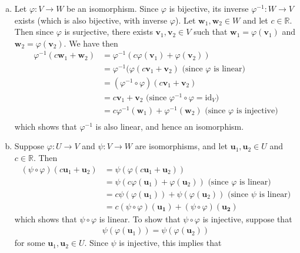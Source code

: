 \documentclass[12pt,letterpaper,reqno]{article}
\numberwithin{equation}{section}
\newcommand{\R}{\ensuremath{\mathbb R}}
\begin{document}
\begin{pf}
\begin{enumerate}[(a)]
	\item Let $\varphi:V \to W$ be an isomorphism. Since $\varphi$ is bijective, its inverse $\varphi^{-1}:W \to V$ exists (which is also bijective, with inverse $\varphi$). Let $\mathbf{w}_1, \mathbf{w}_2 \in W$ and let $c \in \R$. Then since $\varphi$ is surjective, there exists $\mathbf{v}_1, \mathbf{v}_2 \in V$ such that $\mathbf{w}_1=\varphi(\mathbf{v}_1)$ and $\mathbf{w}_2=\varphi(\mathbf{v}_2)$. We have then
	\begin{align*}
		\varphi^{-1}(c\mathbf{w}_1+\mathbf{w}_2)&=\varphi^{-1}(c\varphi(\mathbf{v}_1)+\varphi(\mathbf{v}_2)) \\
		&=\varphi^{-1}(\varphi(c\mathbf{v}_1+\mathbf{v}_2) \text{ (since $\varphi$ is linear)} \\
		&=(\varphi^{-1}\circ\varphi)(c\mathbf{v}_1+\mathbf{v}_2)  \\
		&=c\mathbf{v}_1+\mathbf{v}_2\text{ (since $\varphi^{-1}\circ\varphi=\text{id}_V$)} \\
		&=c\varphi^{-1}(\mathbf{w}_1)+\varphi^{-1}(\mathbf{w}_2) \text{ (since $\varphi$ is injective)}\\
	\end{align*}
	which shows that $\varphi^{-1}$ is also linear, and hence an isomorphism.
	\item Suppose $\varphi:U \to V$ and $\psi:V \to W$ are isomorphisms, and let $\mathbf{u}_1, \mathbf{u}_2 \in U$ and $c \in \R$. Then
	\begin{align*}
		(\psi \circ \varphi)(c\mathbf{u}_1+\mathbf{u}_2)&=\psi(\varphi(c\mathbf{u}_1+\mathbf{u}_2)) \\
		&=\psi(c\varphi(\mathbf{u}_1)+\varphi(\mathbf{u}_2)) \text{ (since $\varphi$ is linear)} \\
		&=c\psi(\varphi(\mathbf{u}_1))+\psi(\varphi(\mathbf{u}_2)) \text{ (since $\psi$ is linear)} \\
		&=c(\psi \circ \varphi)(\mathbf{u_1})+(\psi \circ \varphi)(\mathbf{u_2})
	\end{align*}
	which shows that $\psi \circ \varphi$ is linear. To show that $\psi \circ \varphi$ is injective, suppose that 
	\begin{align*}
		\psi(\varphi(\mathbf{u}_1))=\psi(\varphi(\mathbf{u}_2))
	\end{align*}	
	 for some $\mathbf{u}_1,\mathbf{u}_2 \in U$. Since $\psi$ is injective, this implies that 
	 \begin{align*}

\end{align*}
\end{enumerate}
\end{pf}
\end{document}
